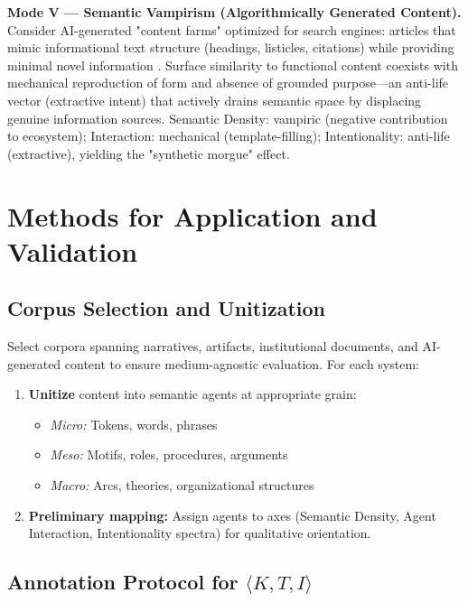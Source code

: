 \documentclass[12pt]{article}
\begin{document}
\textbf{Mode V — Semantic Vampirism (Algorithmically Generated Content).} Consider AI-generated "content farms" optimized for search engines: articles that mimic informational text structure (headings, listicles, citations) while providing minimal novel information \citep{goldstein2023generative}. Surface similarity to functional content coexists with mechanical reproduction of form and absence of grounded purpose—an anti-life vector (extractive intent) that actively drains semantic space by displacing genuine information sources. Semantic Density: vampiric (negative contribution to ecosystem); Interaction: mechanical (template-filling); Intentionality: anti-life (extractive), yielding the "synthetic morgue" effect.

\section{Methods for Application and Validation}
\label{sec:methods}

\subsection{Corpus Selection and Unitization}

Select corpora spanning narratives, artifacts, institutional documents, and AI-generated content to ensure medium-agnostic evaluation. For each system:

\begin{enumerate}
\item \textbf{Unitize} content into semantic agents at appropriate grain:
\begin{itemize}
\item \textit{Micro:} Tokens, words, phrases
\item \textit{Meso:} Motifs, roles, procedures, arguments
\item \textit{Macro:} Arcs, theories, organizational structures
\end{itemize}

\item \textbf{Preliminary mapping:} Assign agents to axes (Semantic Density, Agent Interaction, Intentionality spectra) for qualitative orientation.
\end{enumerate}

\subsection{Annotation Protocol for $\langle K, T, I \rangle$}
\end{document}
